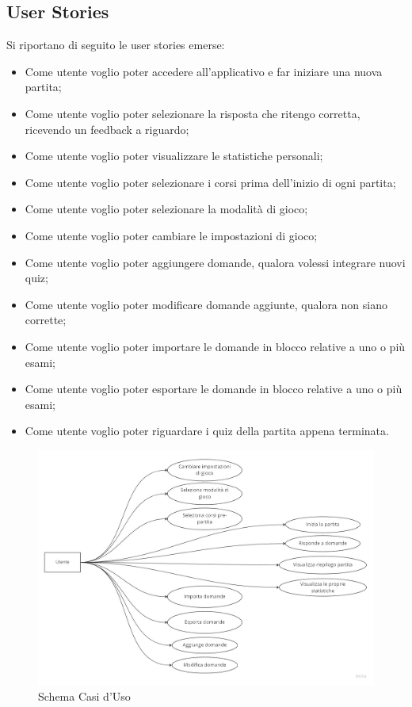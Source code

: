         \subsection{User Stories}
        Si riportano di seguito le user stories emerse:
        \begin{itemize}
            \item Come utente voglio poter accedere all'applicativo e far iniziare una nuova partita;
            \item Come utente voglio poter selezionare la risposta che ritengo corretta, ricevendo un feedback a riguardo;
            \item Come utente voglio poter visualizzare le statistiche personali;
            \item Come utente voglio poter selezionare i corsi prima dell'inizio di ogni partita;
            \item Come utente voglio poter selezionare la modalità di gioco;
            \item Come utente voglio poter cambiare le impostazioni di gioco;
            \item Come utente voglio poter aggiungere domande, qualora volessi integrare nuovi quiz;
            \item Come utente voglio poter modificare domande aggiunte, qualora non siano corrette;
            \item Come utente voglio poter importare le domande in blocco relative a uno o più esami;
            \item Come utente voglio poter esportare le domande in blocco relative a uno o più esami;
            \item Come utente voglio poter riguardare i quiz della partita appena terminata.
        \end{itemize}
        
        \begin{figure}[H]
            \centering
            \includegraphics[width=\textwidth]{Miro/use-case.jpg}
            \caption{Schema Casi d'Uso}
            \label{fig:use-case}
        \end{figure}

